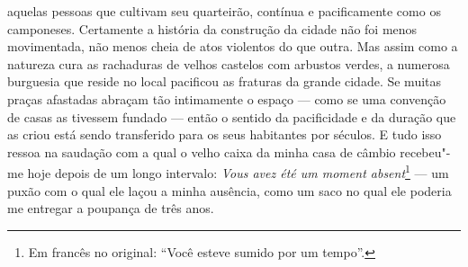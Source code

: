 aquelas pessoas que cultivam seu quarteirão, contínua e pacificamente
como os camponeses. Certamente a história da construção da cidade não
foi menos movimentada, não menos cheia de atos violentos do que outra.
Mas assim como a natureza cura as rachaduras de velhos castelos com
arbustos verdes, a numerosa burguesia que reside no local pacificou as
fraturas da grande cidade. Se muitas praças afastadas abraçam tão
intimamente o espaço --- como se uma convenção de casas as tivessem
fundado --- então o sentido da pacificidade e da duração que as criou
está sendo transferido para os seus habitantes por séculos. E tudo isso
ressoa na saudação com a qual o velho caixa da minha casa de câmbio
recebeu"-me hoje depois de um longo intervalo: \emph{Vous avez été um
moment absent}\footnote{Em francês no original: ``Você esteve sumido por um tempo''. \versal{[N. T.]}} --- um puxão com o qual ele laçou a minha
ausência, como um saco no qual ele poderia me entregar a poupança de
três anos.

